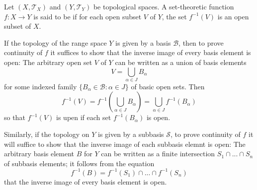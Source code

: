 \documentclass[12pt, a4paper, oneside, openright, titlepage]{book}
\begin{document}
\begin{definition}
    Let $(X,\mathcal{T}_X)$ and $(Y,\mathcal{T}_Y)$ be topological spaces. A set-theoretic function $f:X\rightarrow Y$ is said to be  if for each open subset $V$ of $Y$, the set $f^{-1}(V)$ is an open subset of $X$.
\end{definition}


\begin{remark}
    If the topology of the range space $Y$ is given by a basis $\mathcal{B}$, then to prove continuity of $f$ it suffices to show that the inverse image of every basis element is open: The arbitrary open set $V$ of $Y$ can be written as a union of basis elements \begin{equation*}
        V = \bigcup_{\alpha \in J}B_{\alpha}
    \end{equation*}
    for some indexed family $\{B_{\alpha} \in\mathcal{B}: \alpha \in J\}$ of basic open sets. Then \begin{equation*}
        f^{-1}(V) = f^{-1}\left(\bigcup_{\alpha \in J}B_{\alpha}\right) = \bigcup_{\alpha \in J}f^{-1}(B_{\alpha})
    \end{equation*}
    so that $f^{-1}(V)$ is upen if each set $f^{-1}(B_{\alpha})$ is open. 

    Similarly, if the topology on $Y$ is given by a subbasis $\mathcal{S}$, to prove continuity of $f$ it will suffice to show that the inverse image of each subbasis elemnt is open: The arbitrary basis element $B$ for $Y$ can be written as a finite intersection $S_1\cap...\cap S_n$ of subbasis elements; it follows from the equation \begin{equation*}
        f^{-1}(B) = f^{-1}(S_1)\cap...\cap f^{-1}(S_n)
    \end{equation*}
    that the inverse image of every basis element is open.
\end{remark}
\end{document}
